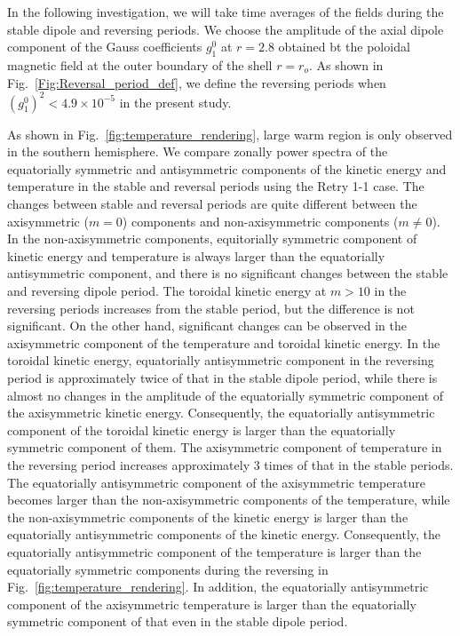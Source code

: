 In the following investigation, we will take time averages of the fields during the stable dipole and reversing periods. 
We choose the amplitude of the axial dipole component of the Gauss coefficients $g_{1}^{0}$ at $r = 2.8$ obtained bt the poloidal magnetic field at the outer boundary of the shell $r = r_{o}$. 
As shown in Fig.~\ref{Fig:Reversal_period_def}, we define the reversing periods when $\left( g_{1}^{0} \right)^2 < 4.9 \times 10^{-5}$ in the present study. 

As shown in Fig.~\ref{fig:temperature_rendering}, large warm region is only observed in the southern hemisphere. 
We compare zonally power spectra of the equatorially symmetric and antisymmetric components of the kinetic energy and temperature in the stable and reversal periods using the Retry 1-1 case. 
The changes between stable and reversal periods are quite different between the axisymmetric ($m = 0$) components and non-axisymmetric components ($m \ne 0$). 
In the non-axisymmetric components, equitorially symmetric component of kinetic energy and temperature is always larger than the equatorially antisymmetric component, and there is no significant changes between the stable and reversing dipole period. 
The toroidal kinetic energy at $m > 10$ in the reversing periods increases from the stable period, but the difference is not significant. 
On the other hand, significant changes can be observed in the axisymmetric component of the temperature and toroidal kinetic energy. 
In the toroidal kinetic energy, equatorially antisymmetric component in the reversing period is approximately twice of that in the stable dipole period, while there is almost no changes in the amplitude of the equatorially symmetric component of the axisymmetric kinetic energy.
Consequently, the equatorially antisymmetric component of the toroidal kinetic energy is larger than the equatorially symmetric component of them. 
The axisymmetric component of temperature in the reversing period increases approximately 3 times of that in the stable periods. 
The equatorially antisymmetric component of the axisymmetric temperature becomes larger than the non-axisymmetric components of the temperature, while the non-axisymmetric components of the kinetic energy is larger than the equatorially antisymmetric components of the kinetic energy. 
Consequently, the equatorially antisymmetric component of the temperature is larger than the equatorially symmetric components during the reversing in Fig.~\ref{fig:temperature_rendering}. 
In addition, the equatorially antisymmetric component of the axisymmetric temperature is larger than the equatorially symmetric component of that even in the stable dipole period.

